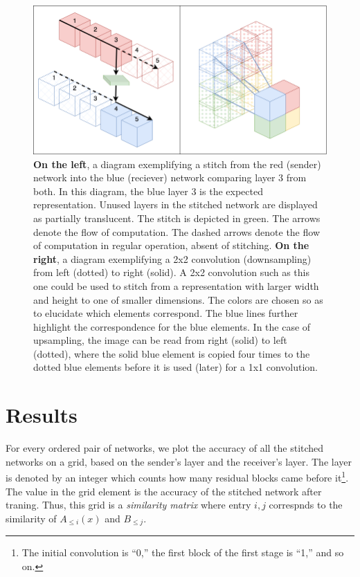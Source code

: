 \documentclass{article}
\begin{document}
\begin{center}
  \begin{figure}[H]
     \centering
     \includegraphics[width=12cm]{stitch2d2.drawio.png}
     \caption{\textbf{On the left}, a diagram exemplifying a stitch from the red (sender) network into the blue (reciever) 
     network comparing layer 3 from both. In this diagram, the blue layer 3 is the expected representation. Unused layers
     in the stitched network are displayed as partially translucent. The stitch
     is depicted in green. The arrows denote the flow of computation. The dashed arrows denote the flow of computation
     in regular operation, absent of stitching. \textbf{On the right}, a diagram exemplifying a 2x2 convolution (downsampling)
     from left (dotted) to right (solid). A 2x2 convolution such as this one could be used to stitch from a representation with 
     larger width and height to one of smaller dimensions. The colors are  chosen so as to elucidate which elements correspond.
     The blue lines further highlight the correspondence for the blue elements.
     In the case of upsampling, the image can be read from right (solid) to left (dotted), where the solid blue 
     element is copied four times to the
     dotted blue elements before it is used (later) for a 1x1 convolution.}
  \end{figure}
\end{center}

\section{Results}
\label{Results}
For every ordered pair of networks, we plot the accuracy of all the stitched networks on a grid,
based on the sender's layer and the receiver's layer. The layer is
denoted by an integer which counts how many residual blocks came before it\footnote{
   The initial convolution is ``0,'' the first block of the first stage is ``1,'' and so on.
}. The value in the grid element is the accuracy of the stitched network after traning. Thus, this
grid is a \textit{similarity matrix} where entry $i, j$ correspnds to the similarity of
$A_{\leq i}(x)$ and $B_{\leq j}$.
\end{document}
